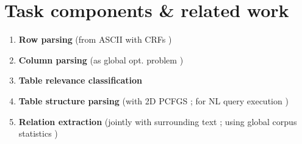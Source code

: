 \documentclass[11pt]{article} %
\begin{document}
\section{Task components \& related work}
\begin{enumerate}
  \item \textbf{Row parsing} (from ASCII with CRFs \cite{McCallum_2003})
  \item \textbf{Column parsing} (as global opt. problem \cite{Ganjam_2015})
  \item \textbf{Table relevance classification}
  \item \textbf{Table structure parsing} (with 2D PCFGS \cite{Lee_2006}; for NL query execution \cite{Liang_2015})
  \item \textbf{Relation extraction} (jointly with surrounding text \cite{Re_2013}; using global corpus statistics \cite{Cafarella_2008})
\end{enumerate}
\end{document}
